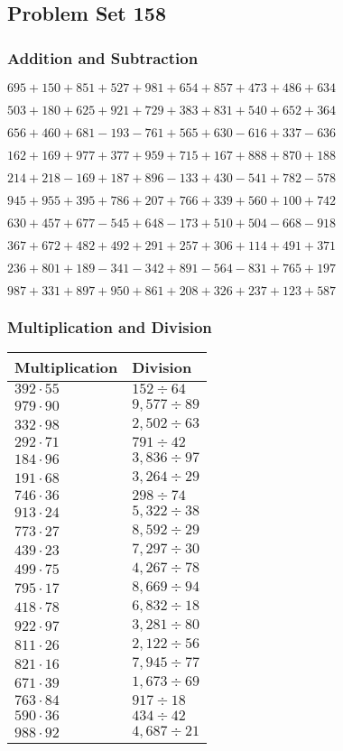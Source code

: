 \hypertarget{problem-set-158}{%
\subsection{Problem Set 158}\label{problem-set-158}}

\hypertarget{addition-and-subtraction}{%
\subsubsection{Addition and
Subtraction}\label{addition-and-subtraction}}

\(695 +150 +851 +527 +981 +654 +857 +473 +486 +634\)

\(503 +180 +625 +921 +729 +383 +831 +540 +652 +364\)

\(656 +460 +681 - 193 - 761 +565 +630 - 616 +337 - 636\)

\(162 +169 +977 +377 +959 +715 +167 +888 +870 +188\)

\(214 +218 - 169 +187 +896 - 133 +430 - 541 +782 - 578\)

\(945 +955 +395 +786 +207 +766 +339 +560 +100 +742\)

\(630 +457 +677 - 545 +648 - 173 +510 +504 - 668 - 918\)

\(367 +672 +482 +492 +291 +257 +306 +114 +491 +371\)

\(236 +801 +189 - 341 - 342 +891 - 564 - 831 +765 +197\)

\(987 +331 +897 +950 +861 +208 +326 +237 +123 +587\)

\hypertarget{multiplication-and-division}{%
\subsubsection{Multiplication and
Division}\label{multiplication-and-division}}

\begin{longtable}[]{@{}ll@{}}
\toprule
Multiplication & Division\tabularnewline
\midrule
\endhead
\(392 \cdot 55\) & \(152÷64\)\tabularnewline
\(979 \cdot 90\) & \(9,577÷89\)\tabularnewline
\(332 \cdot 98\) & \(2,502÷63\)\tabularnewline
\(292 \cdot 71\) & \(791÷42\)\tabularnewline
\(184 \cdot 96\) & \(3,836÷97\)\tabularnewline
\(191 \cdot 68\) & \(3,264÷29\)\tabularnewline
\(746 \cdot 36\) & \(298÷74\)\tabularnewline
\(913 \cdot 24\) & \(5,322÷38\)\tabularnewline
\(773 \cdot 27\) & \(8,592÷29\)\tabularnewline
\(439 \cdot 23\) & \(7,297÷30\)\tabularnewline
\(499 \cdot 75\) & \(4,267÷78\)\tabularnewline
\(795 \cdot 17\) & \(8,669÷94\)\tabularnewline
\(418 \cdot 78\) & \(6,832÷18\)\tabularnewline
\(922 \cdot 97\) & \(3,281÷80\)\tabularnewline
\(811 \cdot 26\) & \(2,122÷56\)\tabularnewline
\(821 \cdot 16\) & \(7,945÷77\)\tabularnewline
\(671 \cdot 39\) & \(1,673÷69\)\tabularnewline
\(763 \cdot 84\) & \(917÷18\)\tabularnewline
\(590 \cdot 36\) & \(434÷42\)\tabularnewline
\(988 \cdot 92\) & \(4,687÷21\)\tabularnewline
\bottomrule
\end{longtable}
